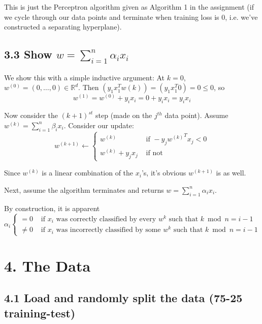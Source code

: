 \documentclass[paper=a4, fontsize=11pt]{scrartcl} %
\numberwithin{equation}{section} %
\numberwithin{figure}{section} %
\numberwithin{table}{section} %
\begin{document}
This is just the Perceptron algorithm given as Algorithm 1 in the assignment (if we cycle through our data points and terminate when training loss is 0, i.e. we've constructed a separating hyperplane).

\subsection*{3.3 Show $w = \sum_{i=1}^n \alpha_i x_i$}

We show this with a simple inductive argument:
At $k = 0$, $w^{(0)} = (0, \dots, 0) \in \mathbb{R}^d$. Then $(y_1x_1^Tw{(k)}) = (y_1x_1^T 0) = 0 \leq 0$,  so 
\[w^{(1)} = w^{(0)} + y_i x_i = 0 + y_i x_i = y_i x_i\]

Now consider the $(k + 1)^{st}$ step (made on the $j^{th}$ data point). Assume $w^{(k)} =  \sum_{i=1}^n \beta_i x_i$. Consider our update:
\[
w^{(k + 1)} \leftarrow 
\begin{cases}
   w^{(k)} & \textrm{ if }  - y_j {w^{(k)}}^T x_j < 0 \\
   w^{(k)} + y_j x_j & \textrm{ if not}
\end{cases}
\]

Since $w^{(k)}$ is a linear combination of the $x_i$'s, it's obvious $w^{(k+1)}$ is as well.

Next, assume the algorithm terminates and returns $w = \sum_{i=1}^n \alpha_i x_i$.

By construction, it is apparent
\[
\alpha_i 
\begin{cases}
   = 0 & \textrm{ if } x_i \textrm{ was correctly classified by every } w^{k} \textrm{ such that } k \bmod n = i - 1 \\
   \neq 0 & \textrm{ if } x_i \textrm{ was incorrectly classified by some } w^{k} \textrm{ such that } k \bmod n = i - 1
\end{cases}
\]


\section*{4. The Data}
\subsection*{4.1 Load and randomly split the data (75-25 training-test)}
\end{document}
